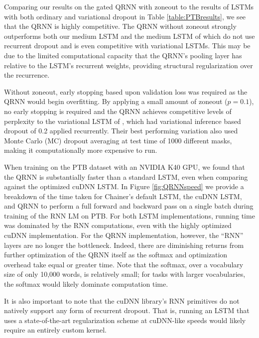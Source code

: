 \documentclass{article} \usepackage{iclr2017_conference,times}
\begin{document}
Comparing our results on the gated QRNN with zoneout to the results of LSTMs with both ordinary and variational dropout in Table \ref{table:PTBresults}, we see that the QRNN is highly competitive.
The QRNN without zoneout strongly outperforms both our medium LSTM and the medium LSTM of \citet{Zaremba2014} which do not use recurrent dropout
and is even competitive with variational LSTMs.
This may be due to the limited computational capacity that the QRNN's pooling layer has relative to the LSTM's recurrent weights,
providing structural regularization over the recurrence.

Without zoneout, early stopping based upon validation loss was required as the QRNN would begin overfitting.
By applying a small amount of zoneout ($p=0.1$), no early stopping is required and the QRNN achieves competitive levels of perplexity to the variational LSTM of \citet{Gal2015}, which had variational inference based dropout of 0.2 applied recurrently.
Their best performing variation also used Monte Carlo (MC) dropout averaging at test time of 1000 different masks, making it computationally more expensive to run.

When training on the PTB dataset with an NVIDIA K40 GPU, we found that the QRNN is substantially faster than a standard LSTM, even when comparing against the optimized cuDNN LSTM.
In Figure \ref{fig:QRNNspeed} we provide a breakdown of the time taken for Chainer's default LSTM, the cuDNN LSTM, and QRNN to perform a full forward and backward pass on a single batch during training of the RNN LM on PTB.
For both LSTM implementations, running time was dominated by the RNN computations, even with the highly optimized cuDNN implementation.
For the QRNN implementation, however, the ``RNN'' layers are no longer the bottleneck.
Indeed, there are diminishing returns from further optimization of the QRNN itself as the softmax and optimization overhead take equal or greater time.
Note that the softmax, over a vocabulary size of only 10,000 words, is relatively small; for tasks with larger vocabularies, the softmax would likely dominate computation time.

It is also important to note that the cuDNN library's RNN primitives do not natively support any form of recurrent dropout. That is, running an LSTM that uses a state-of-the-art regularization scheme at cuDNN-like speeds would likely require an entirely custom kernel.
\end{document}
